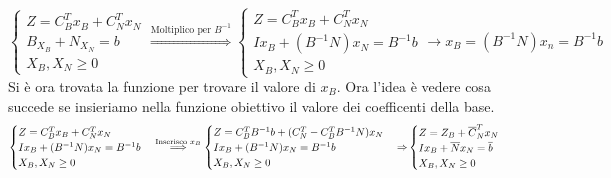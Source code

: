 \documentclass{article}
\begin{document}
$$
  \begin{cases}
    Z=C_B^Tx_B+C^T_Nx_N \\
    B_{X_B}+N_{X_N}=b   \\
    X_B, X_N \ge 0
  \end{cases}
  \overset{\text{Moltiplico per } B^{-1}}{\Longrightarrow}
  \begin{cases}
    Z=C_B^Tx_B+C^T_Nx_N       \\
    Ix_B+(B^{-1}N)x_N=B^{-1}b \\
    X_B, X_N \ge 0
  \end{cases}
  \to x_B= (B^{-1}N)x_n=B^{-1}b
$$
Si è ora trovata la funzione per trovare il valore di $x_B$. Ora l'idea è vedere cosa succede se insieriamo nella funzione obiettivo il valore dei coefficenti della base.
$$
  \begin{cases}
    Z=C_B^Tx_B+C^T_Nx_N       \\
    Ix_B+(B^{-1}N)x_N=B^{-1}b \\
    X_B, X_N \ge 0
  \end{cases}
  \overset{\text{Inserisco }x_B}{\Longrightarrow}
  \begin{cases}
    Z=C_B^TB^{-1}b+(C^T_N-C^T_BB^{-1}N)x_N \\
    Ix_B+(B^{-1}N)x_N=B^{-1}b              \\
    X_B, X_N \ge 0
  \end{cases} \\
  {\Rightarrow}
  \begin{cases}
    Z=Z_B+\overline{C}^T_Nx_N         \\
    Ix_B+\overline{N}x_N=\overline{b} \\
    X_B, X_N \ge 0
  \end{cases}
$$
\end{document}
